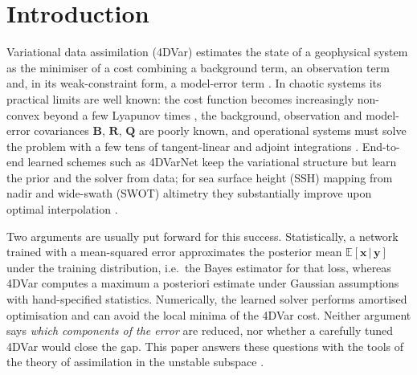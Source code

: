 \documentclass[10pt,a4paper]{article}
\newcommand{\x}{\mathbf{x}}
\newcommand{\y}{\mathbf{y}}
\newcommand{\B}{\mathbf{B}}
\newcommand{\R}{\mathbf{R}}
\newcommand{\E}{\mathbb{E}}
\begin{document}
\section{Introduction}
Variational data assimilation (4DVar) estimates the state of a geophysical system as the minimiser of a cost
combining a background term, an observation term and, in its weak-constraint form, a model-error term
\citep{carrassi2018data}. In chaotic systems its practical limits are well known: the cost function becomes
increasingly non-convex beyond a few Lyapunov times \citep{pires1996extending}, the background, observation and
model-error covariances $\B$, $\R$, $\mathbf{Q}$ are poorly known, and operational systems must solve the problem
with a few tens of tangent-linear and adjoint integrations \citep{courtier1994strategy}.
End-to-end learned schemes such as 4DVarNet \citep{fablet2021learning} keep the variational structure but learn the
prior and the solver from data; for sea surface height (SSH) mapping from nadir and wide-swath (SWOT) altimetry they
substantially improve upon optimal interpolation \citep{beauchamp2023ssh,morrow2019global}.

Two arguments are usually put forward for this success. Statistically, a network trained with a mean-squared error
approximates the posterior mean $\E[\x\,|\,\y]$ under the training distribution, i.e.\ the Bayes estimator for
that loss, whereas 4DVar computes a maximum a posteriori estimate under Gaussian assumptions with hand-specified
statistics. Numerically, the learned solver performs amortised optimisation and can avoid the local minima of the
4DVar cost. Neither argument says \emph{which components of the error} are reduced, nor whether a carefully tuned
4DVar would close the gap. This paper answers these questions with the tools of the theory of assimilation in the
unstable subspace \citep{carrassi2007adaptive,trevisan2010four,bocquet2017degenerate}.
\end{document}
